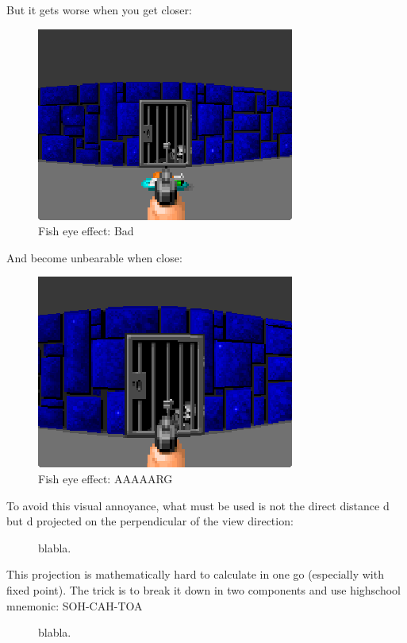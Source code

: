 \documentclass[book.tex]{subfiles}
\begin{document}
But it gets worse when you get closer:
\begin{figure}[H]
\centering
 \includegraphics[scale=1.3]{imgs/fish_eye/bad_ok.png}
 \caption{Fish eye effect: Bad} \label{fig:mips}
 \end{figure}

And become unbearable when close:
 \begin{figure}[H]
\centering
 \includegraphics[scale=1.3]{imgs/fish_eye/bad_bad.png}
 \caption{Fish eye effect: AAAAARG} \label{fig:mips}
 \end{figure}
 
To avoid this visual annoyance, what must be used is not the direct distance d but d projected on the perpendicular of the view direction:

\begin{figure}[H]
\centering
 
 \caption{blabla.} \label{fig:Raycasting2}
\end{figure}

This projection is mathematically hard to calculate in one go (especially with fixed point). The trick is to break it down in two components and use highschool mnemonic: SOH-CAH-TOA\\

\begin{figure}[H]
\centering
 
 \caption{blabla.} \label{fig:Raycasting2}
\end{figure}
\end{document}
